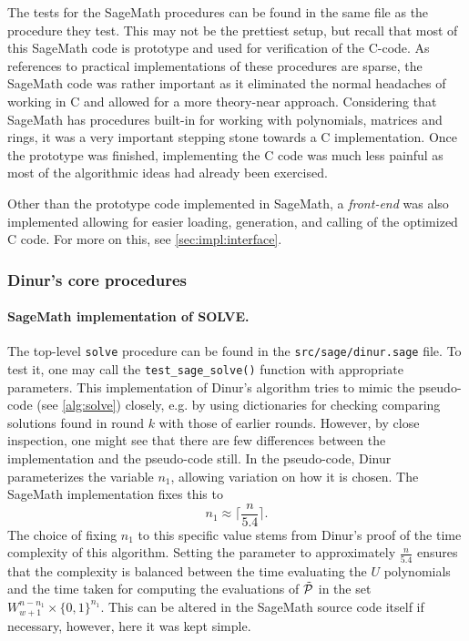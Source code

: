 The tests for the SageMath procedures can be found in the same file as the procedure they test. This may not be the prettiest setup, but recall that most of this SageMath code is prototype and used for verification of the C-code. As references to practical implementations of these procedures are sparse, the SageMath code was rather important as it eliminated the normal headaches of working in C and allowed for a more theory-near approach. Considering that SageMath has procedures built-in for working with polynomials, matrices and rings, it was a very important stepping stone towards a C implementation. Once the prototype was finished, implementing the C code was much less painful as most of the algorithmic ideas had already been exercised.

Other than the prototype code implemented in SageMath, a \textit{front-end} was also implemented allowing for easier loading, generation, and calling of the optimized C code. For more on this, see \cref{sec:impl:interface}.

\subsubsection{Dinur's core procedures}
\paragraph{SageMath implementation of SOLVE.}
The top-level \texttt{solve} procedure can be found in the \texttt{src/sage/dinur.sage} file. To test it, one may call the \texttt{test\_sage\_solve()} function with appropriate parameters. This implementation of Dinur's algorithm tries to mimic the pseudo-code (see \cref{alg:solve}) closely, e.g. by using dictionaries for checking comparing solutions found in round $k$ with those of earlier rounds. However, by close inspection, one might see that there are few differences between the implementation and the pseudo-code still. In the pseudo-code, Dinur parameterizes the variable $n_1$, allowing variation on how it is chosen. The SageMath implementation fixes this to 
$$
    n_1 \approx \lceil \frac{n}{5.4} \rceil.
$$
The choice of fixing $n_1$ to this specific value stems from Dinur's proof of the time complexity of this algorithm. Setting the parameter to approximately $\frac{n}{5.4}$ ensures that the complexity is balanced between the time evaluating the $U$ polynomials and the time taken for computing the evaluations of $\Tilde{\mathcal{P}}$ in the set $W^{n - n_1}_{w + 1} \times \{0,1\}^{n_1}$. This can be altered in the SageMath source code itself if necessary, however, here it was kept simple.

